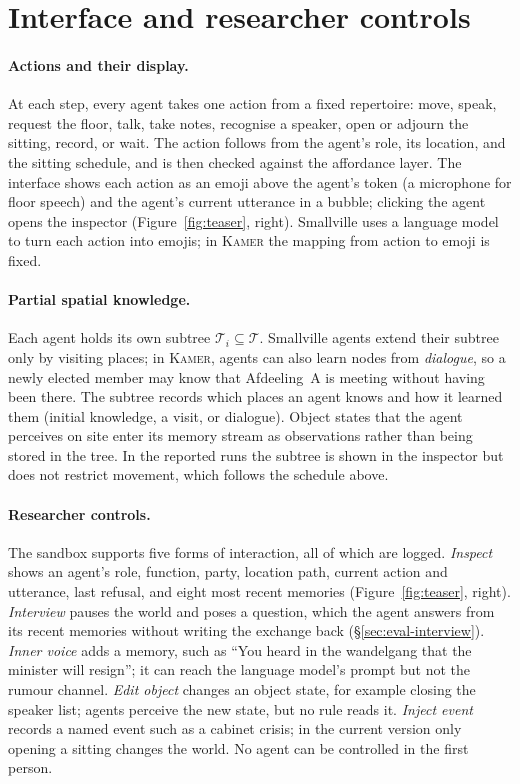 \documentclass[sigconf,review,anonymous]{acmart}
\newcommand{\sys}{\textsc{Kamer}}
\begin{document}
\section{Interface and researcher controls}
\label{app:interface}
\paragraph{Actions and their display.} At each step, every agent takes one
action from a fixed repertoire: move, speak, request the floor, talk, take
notes, recognise a speaker, open or adjourn the sitting, record, or wait.
The action follows from the agent's role, its location, and the sitting
schedule, and is then checked against the affordance layer. The interface
shows each action as an emoji above the agent's token (a microphone for
floor speech) and the agent's current utterance in a bubble; clicking the
agent opens the inspector
(Figure~\ref{fig:teaser}, right). Smallville uses a language model to
turn each action into emojis; in \sys{} the mapping from action to emoji
is fixed.



\paragraph{Partial spatial knowledge.} Each agent holds its own subtree
$\mathcal{T}_i\subseteq\mathcal{T}$. Smallville agents extend their subtree
only by visiting places; in \sys{}, agents can also learn nodes from
\emph{dialogue}, so a newly elected member may know that Afdeeling~A is
meeting without having been there. The subtree records which places an
agent knows and how it learned them (initial knowledge, a visit, or
dialogue). Object states that the agent perceives on site enter its memory
stream as observations rather than being stored in the tree. In the
reported runs the subtree is shown in the inspector but does not restrict
movement, which follows the schedule above.

\paragraph{Researcher controls.} The sandbox supports five forms of
interaction, all of which are logged. \emph{Inspect} shows an agent's
role, function, party, location path, current action and utterance, last
refusal, and eight most recent memories (Figure~\ref{fig:teaser}, right).
\emph{Interview} pauses the world and poses a question, which the agent
answers from its recent memories without writing the exchange back
(\S\ref{sec:eval-interview}). \emph{Inner voice} adds a memory, such as
``You heard in the wandelgang that the minister will resign''; it can
reach the language model's prompt but not the rumour channel.
\emph{Edit object} changes an object state, for example closing the
speaker list; agents perceive the new state, but no rule reads it.
\emph{Inject event} records a named event such as a cabinet crisis; in
the current version only opening a sitting changes the world. No agent can be controlled in
the first person.
\end{document}
